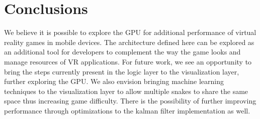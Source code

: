 \documentclass[runningheads]{llncs}
\begin{document}
\section{Conclusions}
We believe it is possible to explore the GPU for additional performance of virtual reality games in mobile devices. The architecture defined here can be explored as an additional tool for developers to complement the way the game looks and manage resources of VR applications. For future work, we see an opportunity to bring the steps currently present in the logic layer to the visualization layer, further exploring the GPU. We also envision bringing machine learning techniques to the visualization layer to allow multiple snakes to share the same space thus increasing game difficulty. There is the possibility of further improving performance through optimizations to the kalman filter implementation as well.
%
%
%


\end{document}
